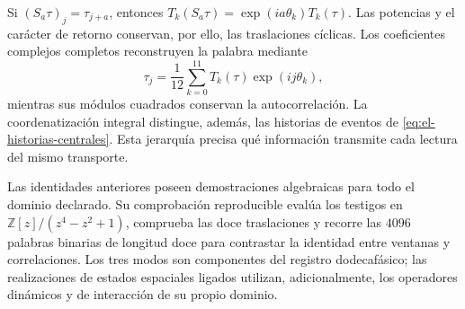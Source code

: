 Si \((S_a\tau)_j=\tau_{j+a}\), entonces
\(T_k(S_a\tau)=\exp(ia\theta_k)T_k(\tau)\).
Las potencias y el carácter de retorno conservan, por ello, las
traslaciones cíclicas. Los coeficientes complejos completos
reconstruyen la palabra mediante
\[
 \tau_j=\frac1{12}\sum_{k=0}^{11}T_k(\tau)\exp(ij\theta_k),
\]
mientras sus módulos cuadrados conservan la autocorrelación.
La coordenatización integral distingue, además, las historias de eventos de
\eqref{eq:el-historias-centrales}. Esta jerarquía precisa qué
información transmite cada lectura del mismo transporte.

Las identidades anteriores poseen demostraciones algebraicas para
todo el dominio declarado. Su comprobación reproducible evalúa los
testigos en \(\mathbb Z[z]/(z^4-z^2+1)\), comprueba las doce
traslaciones y recorre las \(4096\) palabras binarias de longitud
doce para contrastar la identidad entre ventanas y correlaciones.
Los tres modos son componentes del registro dodecafásico; las
realizaciones de estados espaciales ligados utilizan, adicionalmente,
los operadores dinámicos y de interacción de su propio dominio.
